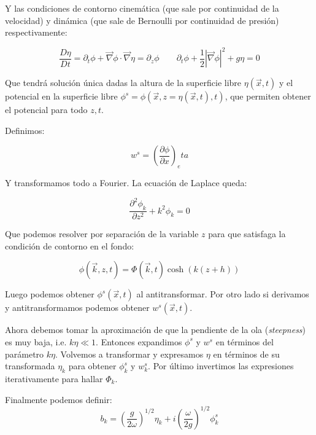 Y las condiciones de contorno cinemática (que sale por continuidad de la velocidad) y dinámica (que sale de Bernoulli por continuidad de presión) respectivamente:

\begin{equation}
	\frac{D\eta}{Dt} = \partial_t \phi + \vec \nabla \phi \cdot \vec \nabla \eta = \partial_z \phi	 \qquad  \partial_t \phi + \frac{1}{2} |\vec \nabla \phi|^2 + g\eta = 0
\end{equation}

Que tendrá solución única dadas la altura de la superficie libre $\eta(\vec x,t)$ y el potencial en la superficie libre $\phi^s=\phi(\vec x, z=\eta(\vec x, t), t)$, que permiten obtener el potencial para todo $z, t$. \cite{meiTheoryApplicationsOcean2016}

Definimos:

\begin{equation}
	w^s = \left(\frac{\partial\phi}{\partial x}\right)_eta
\end{equation} 

Y transformamos todo a Fourier. La ecuación de Laplace queda:

\begin{equation}
	\frac{\partial^2\phi_k}{\partial z^2} + k^2 \phi_k = 0
\end{equation}

Que podemos resolver por separación de la variable $z$ para que satisfaga la condición de contorno en el fondo:

\begin{equation}
	\phi(\vec k, z, t) = \Phi(\vec k, t) \cosh(k(z+h))
\end{equation}

Luego podemos obtener $\phi^s(\vec x, t)$ al antitransformar. Por otro lado si derivamos y antitransformamos podemos obtener $w^s(\vec x, t)$.

Ahora debemos tomar la aproximación de que la pendiente de la ola (\textit{steepness}) es muy baja, i.e. $k\eta\ll1$. Entonces expandimos $\phi^s$ y $w^s$ en términos del parámetro $k\eta$. Volvemos a transformar y expresamos $\eta$ en términos de su transformada $\eta_k$ para obtener $\phi^s_k$ y $w^s_k$. Por último invertimos las expresiones iterativamente para hallar $\Phi_k$. 

Finalmente podemos definir:
\begin{equation}
	b_k = \left(\frac{g}{2\omega}\right)^{1/2} \eta_k + i \left(\frac{\omega}{2g}\right)^{1/2}\phi^s_k
\end{equation}

